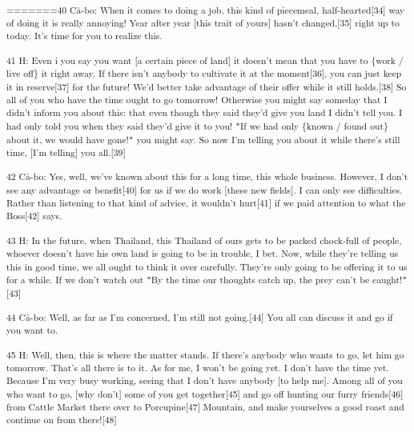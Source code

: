 {\textsuperscript{=======40 Cà-bo: When it comes to doing a job, this kind
of piecemeal, half-hearted[34] way of doing it is really annoying! Year after year
[this trait of yours] hasn't changed,[35] right up to today. It's time for you
to realize this. }}

{\textsuperscript{41 H: Even i you say you want [a certain piece of land]
it doesn't mean that you have to \{work / live off\} it right away. If there isn't
anybody to cultivate it at the moment[36], you can just keep it in reserve[37]
for the future! We'd better take advantage of their offer while it still holds.[38]
So all of you who have the time ought to go tomorrow! Otherwise you might say someday
that I didn't inform you about this: that even though they said they'd give you
land I didn't tell you. I had only told you when they said they'd give it to you!
\texttt{"}If we had only \{known / found out\} about it, we would have gone!\texttt{"}
you might say. So now I'm telling you about it while there's still time, [I'm telling]
you all.[39]}}

{\textsuperscript{42 Cà-bo: Yes, well, we've known about this for a long
time, this whole business. However, I don't see any advantage or benefit[40] for
us if we do work [these new fields]. I can only see difficulties. Rather than listening
to that kind of advice, it wouldn't hurt[41] if we paid attention to what the Boss[42]
says. }}

{\textsuperscript{43 H: In the future, when Thailand, this Thailand of ours
gets to be packed chock-full of people, whoever doesn't have his own land is going
to be in trouble, I bet. Now, while they're telling us this in good time, we all
ought to think it over carefully. They're only going to be offering it to us for
a while. If we don't watch out \texttt{"}By the time our thoughts catch up, the
prey can't be caught!\texttt{"}[43]}}

{\textsuperscript{44 Cà-bo: Well, as far as I'm concerned, I'm still not
going.[44] You all can discuss it and go if you want to. }}

{\textsuperscript{45 H: Well, then, this is where the matter stands. If
there's anybody who wants to go, let him go tomorrow. That's all there is to it.
As for me, I won't be going yet. I don't have the time yet. Because I'm very busy
working, seeing that I don't have anybody [to help me]. Among all of you who want
to go, [why don't] some of you get together[45] and go off hunting our furry friends[46]
from Cattle Market there over to Porcupine[47] Mountain, and make yourselves a
good roast and continue on from there![48]}}

